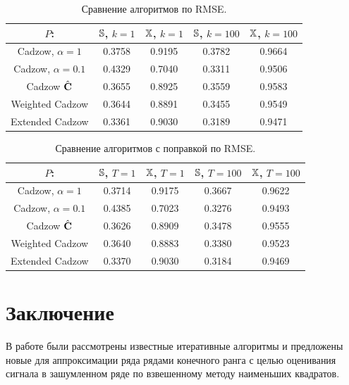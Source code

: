\documentclass[12pt,a4paper,fleqn,leqno]{article}
\begin{document}
\begin{table}[!hhh]
\begin{center}
\caption{Сравнение алгоритмов по RMSE.}\label{fintable}
\begin{tabular}{|c|c|c|c|c|}
\hline
$P$: & $\mathbb{S}$, $k = 1$ & $\mathbb{X}$, $k = 1$ & $\mathbb{S}$, $k = 100$ & $\mathbb{X}$, $k = 100$  \\
\hline
Cadzow, $\alpha = 1$ & 0.3758 & 0.9195 & 0.3782 & 0.9664 \\
\hline
Cadzow, $\alpha = 0.1$ & 0.4329 & 0.7040 & 0.3311 & 0.9506 \\
\hline
Cadzow $\hat{\mathbf{C}}$ & 0.3655 & 0.8925 & 0.3559 & 0.9583 \\
\hline
Weighted Cadzow & 0.3644 & 0.8891 & 0.3455 & 0.9549 \\
\hline
Extended Cadzow & 0.3361 & 0.9030 & 0.3189 & 0.9471 \\
\hline
\end{tabular}
\end{center}
\end{table}

\begin{table}[!hhh]
	\begin{center}
		\caption{Сравнение алгоритмов с поправкой по RMSE.}\label{fintable_improved}
		\begin{tabular}{|c|c|c|c|c|}
			\hline
			$P$: & $\mathbb{S}$, $T = 1$ & $\mathbb{X}$, $T = 1$ & $\mathbb{S}$, $T = 100$ & $\mathbb{X}$, $T = 100$  \\
			\hline
			Cadzow, $\alpha = 1$ & 0.3714 & 0.9175 & 0.3667 & 0.9622 \\
			\hline
			Cadzow, $\alpha = 0.1$ & 0.4385 & 0.7023 & 0.3276 & 0.9493 \\
			\hline
			Cadzow $\hat{\mathbf{C}}$ & 0.3626 & 0.8909 & 0.3478 & 0.9555 \\
			\hline
			Weighted Cadzow & 0.3640 & 0.8883 & 0.3380 & 0.9523 \\
			\hline
			Extended Cadzow & 0.3370 & 0.9030 & 0.3184 & 0.9469 \\
			\hline
		\end{tabular}
	\end{center}
\end{table}

\section{Заключение}
\label{sec:concl}
В работе были рассмотрены известные итеративные алгоритмы и предложены новые для аппроксимации ряда рядами конечного ранга с целью
оценивания сигнала в зашумленном ряде по взвешенному методу наименьших квадратов.
\end{document}
